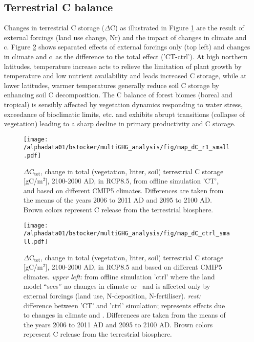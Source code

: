 \subsection{Terrestrial C balance}
\label{sec:dC}
Changes in terrestrial C storage ($\Delta$C) as illustrated in Figure \ref{fig:dC_CT} are the result of external forcings (land use change, Nr) and the impact of changes in climate and c\coo . Figure \ref{fig:dC_ctrl} shows separated effects of external forcings only (top left) and changes in climate and c\coo\ as the difference to the total effect ('CT-ctrl'). At high northern latitudes, temperature increase acts to relieve the limitation of plant growth by temperature and low nutrient availability and leads increased C storage, while at lower latitudes, warmer temperatures generally reduce soil C storage by enhancing soil C decomposition. The C balance of forest biomes (boreal and tropical) is sensibly affected by vegetation dynamics responding to water stress, exceedance of bioclimatic limits, etc. and exhibits abrupt transitions (collapse of vegetation) leading to a sharp decline in primary productivity and C storage.
\begin{figure}[ht!]
  \texttt{[image: /alphadata01/bstocker/multiGHG\_analysis/fig/map\_dC\_r1\_small.pdf]}
\caption[Maps of future C storage change for different climate change patterns (RCP 8.5)]{$\Delta$C$_{\mathrm{tot}}$, change in total (vegetation, litter, soil) terrestrial C storage [gC/m$^2$], 2100-2000 AD, in RCP8.5, from offline simulation 'CT', and based on different CMIP5 climates. Differences are taken from the means of the years 2006 to 2011 AD and 2095 to 2100 AD. Brown colors represent C release from the terrestrial biosphere.}
\label{fig:dC_CT}
\end{figure}

\begin{figure}[ht!]
  \texttt{[image: /alphadata01/bstocker/multiGHG\_analysis/fig/map\_dC\_ctrl\_small.pdf]}
\caption[Maps of future C storage change, separated by effects from land use change and effects from different climate change patterns (RCP8.5)]{$\Delta$C$_{\mathrm{tot}}$, change in total (vegetation, litter, soil) terrestrial C storage [gC/m$^2$], 2100-2000 AD, in RCP8.5 and based on different CMIP5 climates. {\it upper left: } from offline simulation 'ctrl' where the land model ``sees'' no changes in climate or \coo\ and is affected only by external forcings (land use, N-deposition, N-fertiliser). {\it rest: } difference between 'CT' and 'ctrl' simulation; represents effects due to changes in climate and \coo . Differences are taken from the means of the years 2006 to 2011 AD and 2095 to 2100 AD. Brown colors represent C release from the terrestrial biosphere.}
\label{fig:dC_ctrl}
\end{figure}


